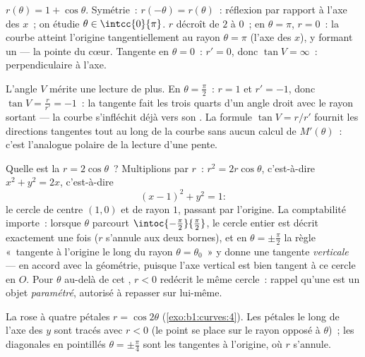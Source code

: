 \begin{example}[La cardioïde]\label{ex:b1:curves:cardioid}
$r(\theta) = 1 + \cos\theta$. Symétrie~: $r(-\theta)
= r(\theta)$~: réflexion par rapport à l'axe des $x$~; on étudie
$\theta \in \intcc{0}{\pi}$. $r$ décroît de $2$ à $0$~; en $\theta =
\pi$, $r = 0$~: la courbe atteint l'origine tangentiellement au rayon
$\theta = \pi$ (l'axe des $x$), y formant un 
--- la pointe du cœur. Tangente en $\theta = 0$~: $r' = 0$, donc
$\tan V = \infty$~: perpendiculaire à l'axe.

L'angle $V$ mérite une lecture de plus. En $\theta =
\frac\pi2$~: $r = 1$ et $r' = -1$, donc $\tan V = \frac{r}{r'} =
-1$~: la tangente fait les trois quarts d'un angle droit avec le
rayon sortant --- la courbe s'infléchit déjà vers son . La formule $\tan V = r/r'$ fournit les directions
tangentes tout au long de la courbe sans aucun calcul de
$M'(\theta)$~: c'est l'analogue polaire de la lecture d'une pente.
\end{example}

\begin{example}
\label{ex:b1:curves:polarcircle}
Quelle est la  $r = 2\cos\theta$~? Multiplions par $r$~:
$r^2 = 2r\cos\theta$, c'est-à-dire $x^2 + y^2 = 2x$, c'est-à-dire
\[
(x - 1)^2 + y^2 = 1 :
\]
le cercle de centre $(1, 0)$ et de rayon $1$, passant par
l'origine. La comptabilité importe~: lorsque $\theta$ parcourt
$\intoc{-\frac\pi2}{\frac\pi2}$, le cercle entier est décrit
exactement une fois ($r$ s'annule aux deux bornes), et en $\theta =
\pm\frac\pi2$ la règle «~tangente à l'origine le long du rayon
$\theta = \theta_0$~» y donne une tangente \emph{verticale} ---
en accord avec la géométrie, puisque l'axe vertical est bien tangent
à ce cercle en $O$. Pour $\theta$ au-delà de cet , $r < 0$
redécrit le même cercle~: rappel qu'une  est un
objet \emph{paramétré}, autorisé à repasser sur lui-même.
\end{example}

\begin{omfigure}

{\small La rose à quatre pétales $r = \cos 2\theta$
(\cref{exo:b1:curves:4}). Les pétales le long de l'axe des $y$ sont
tracés avec $r < 0$ (le point se place sur le rayon opposé à
$\theta$)~; les diagonales en pointillés $\theta = \pm\frac\pi4$ sont
les tangentes à l'origine, où $r$ s'annule.}
\end{omfigure}

